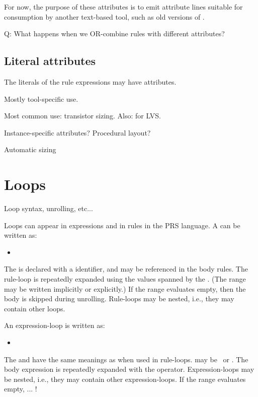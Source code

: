 For now, the purpose of these attributes is to emit
attribute lines suitable for consumption by another text-based tool, 
such as old versions of .  

Q:
What happens when we OR-combine rules with different attributes?

\subsection{Literal attributes}
\label{sec:prs:attrib:literal}

The literals of the rule expressions may have attributes.  

Mostly tool-specific use.

Most common use: transistor sizing.  
Also: for LVS.  

Instance-specific attributes?
Procedural layout?

Automatic sizing

\section{Loops}
\label{sec:prs:loops}

Loop syntax, unrolling, etc...

Loops can appear in expressions and in rules in the PRS language.  
A  can be written as:

\begin{itemize}
\item \ttt{(:}  \ttt{:}  \ttt{:}
	 \ttt{)}
\end{itemize}

The  is declared with a identifier, and may be referenced
in the body rules.  
The rule-loop is repeatedly expanded using the values spanned
by the .  
(The range may be written implicitly or explicitly.)
If the range evaluates empty, then the body is skipped during unrolling.  
Rule-loops may be nested, i.e., they may contain other loops.  

An expression-loop is written as:
\begin{itemize}
\item \ttt{(}  \ttt{:}  \ttt{:}  \ttt{:}
	 \ttt{)}
\end{itemize}
The  and  have the same meanings as when used
in rule-loops.  
 may be \prsand\ or \prsor.  
The body expression is repeatedly expanded with the  operator.  
Expression-loops may be nested, i.e., they may contain other expression-loops.  
If the range evaluates empty, ...
!

